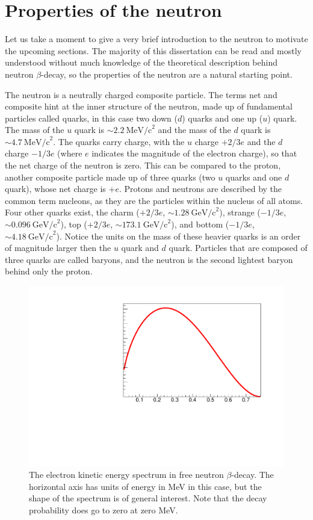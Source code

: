\section{Properties of the neutron}
\label{sec:neutronProperties}
Let us take a moment to give a very brief introduction to the neutron to motivate the
upcoming sections. The majority of this dissertation can be read and mostly understood
without much knowledge of the theoretical description behind neutron $\beta$-decay,
so the properties of the neutron are a natural starting point.

The neutron is a neutrally charged composite particle. The terms net and
composite hint at the inner structure of the neutron, made up of fundamental
particles called quarks, in this case two down ($d$) quarks and one up ($u$) quark.
The mass of the $u$ quark is $\sim2.2~\mathrm{MeV/c}^2$ and the mass of the
$d$ quark is $\sim4.7~\mathrm{MeV/c}^2$.
The quarks carry charge, with the $u$ charge $+2/3e$ and the $d$ charge
$-1/3e$ (where $e$ indicates the magnitude of the electron charge),
so that the net charge of the neutron is zero. This can be compared
to the proton, another composite particle made up of three quarks (two $u$ quarks and
one $d$ quark), whose net charge is $+e$. Protons and neutrons are described
by the common term nucleons, as they are the particles within the nucleus of all
atoms. Four other quarks exist, 
the charm ($+2/3e$, $\sim1.28~\mathrm{GeV/c}^2$), strange ($-1/3e$, $\sim0.096~\mathrm{GeV/c}^2$),
top ($+2/3e$, $\sim173.1~\mathrm{GeV/c}^2$), and  bottom ($-1/3e$, $\sim4.18~\mathrm{GeV/c}^2$). Notice
the units on the mass of these heavier quarks is an order of magnitude larger then the $u$ quark and $d$ quark.
Particles that are composed of three quarks are called baryons, and the neutron
is the second lightest baryon
behind only the proton.

\begin{figure}
  \centering
  \includegraphics[page=1,scale=0.4]{1-Introduction/betaSpectrum.pdf}
    \caption{The electron kinetic energy spectrum in free neutron $\beta$-decay. The horizontal
      axis has units of energy in MeV in this case, but the shape of the spectrum
      is of general interest. Note that the decay probability does go to zero at zero
      MeV.}
  \label{fig:betaSpectrum}
\end{figure}

